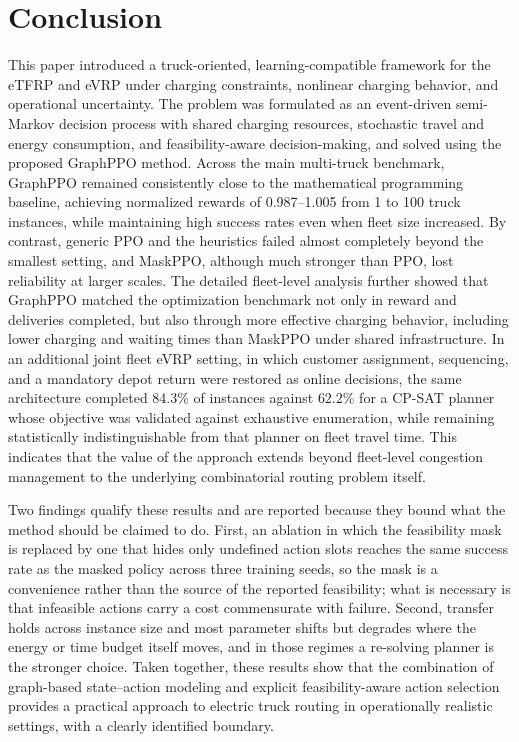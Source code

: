 \documentclass[a4paper,fleqn]{cas-sc}
\begin{document}
\section{Conclusion}

This paper introduced a truck-oriented, learning-compatible framework for the eTFRP and eVRP under charging constraints, nonlinear charging behavior, and operational uncertainty. The problem was formulated as an event-driven semi-Markov decision process with shared charging resources, stochastic travel and energy consumption, and feasibility-aware decision-making, and solved using the proposed GraphPPO method. Across the main multi-truck benchmark, GraphPPO remained consistently close to the mathematical programming baseline, achieving normalized rewards of 0.987--1.005 from 1 to 100 truck instances, while maintaining high success rates even when fleet size increased. By contrast, generic PPO and the heuristics failed almost completely beyond the smallest setting, and MaskPPO, although much stronger than PPO, lost reliability at larger scales. The detailed fleet-level analysis further showed that GraphPPO matched the optimization benchmark not only in reward and deliveries completed, but also through more effective charging behavior, including lower charging and waiting times than MaskPPO under shared infrastructure. In an additional joint fleet eVRP setting, in which customer assignment, sequencing, and a mandatory depot return were restored as online decisions, the same architecture completed $84.3\%$ of instances against $62.2\%$ for a CP-SAT planner whose objective was validated against exhaustive enumeration, while remaining statistically indistinguishable from that planner on fleet travel time. This indicates that the value of the approach extends beyond fleet-level congestion management to the underlying combinatorial routing problem itself.

Two findings qualify these results and are reported because they bound what the method should be claimed to do. First, an ablation in which the feasibility mask is replaced by one that hides only undefined action slots reaches the same success rate as the masked policy across three training seeds, so the mask is a convenience rather than the source of the reported feasibility; what is necessary is that infeasible actions carry a cost commensurate with failure. Second, transfer holds across instance size and most parameter shifts but degrades where the energy or time budget itself moves, and in those regimes a re-solving planner is the stronger choice. Taken together, these results show that the combination of graph-based state--action modeling and explicit feasibility-aware action selection provides a practical approach to electric truck routing in operationally realistic settings, with a clearly identified boundary. 
\end{document}
